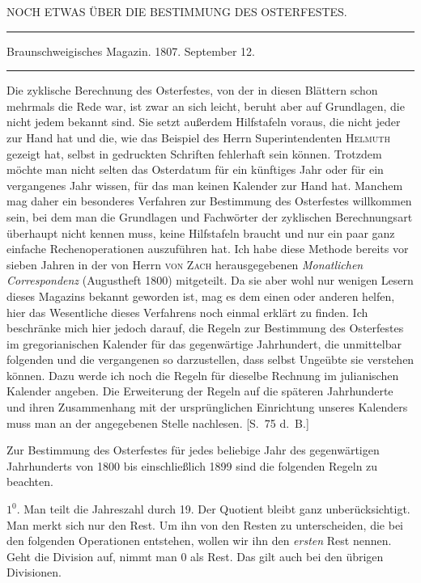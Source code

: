 \clearpage{}%
\begin{center}
{\large NOCH ETWAS ÜBER DIE BESTIMMUNG DES OSTERFESTES.\par}
\medskip\hrule\medskip
{\small Braunschweigisches Magazin. 1807. September 12.\par}
\medskip\hrule
\end{center}\medskip
Die zyklische Berechnung des Osterfestes, von der in diesen Blättern schon mehrmals die Rede war, ist zwar an sich leicht, beruht aber auf Grundlagen, die nicht jedem bekannt sind. Sie setzt außerdem Hilfstafeln voraus, die nicht jeder zur Hand hat und die, wie das Beispiel des Herrn Superintendenten \textsc{Helmuth} gezeigt hat, selbst in gedruckten Schriften fehlerhaft sein können. Trotzdem möchte man nicht selten das Osterdatum für ein künftiges Jahr oder für ein vergangenes Jahr wissen, für das man keinen Kalender zur Hand hat. Manchem mag daher ein besonderes Verfahren zur Bestimmung des Osterfestes willkommen sein, bei dem man die Grundlagen und Fachwörter der zyklischen Berechnungsart überhaupt nicht kennen muss, keine Hilfstafeln braucht und nur ein paar ganz einfache Rechenoperationen auszuführen hat. Ich habe diese Methode bereits vor sieben Jahren in der von Herrn \textsc{von Zach} herausgegebenen \textit{Monatlichen Correspondenz} (Augustheft 1800) mitgeteilt. Da sie aber wohl nur wenigen Lesern dieses Magazins bekannt geworden ist, mag es dem einen oder anderen helfen, hier das Wesentliche dieses Verfahrens noch einmal erklärt zu finden. Ich beschränke mich hier jedoch darauf, die Regeln zur Bestimmung des Osterfestes im gregorianischen Kalender für das gegenwärtige Jahrhundert, die unmittelbar %
%
folgenden und die vergangenen so darzustellen, dass selbst Ungeübte sie verstehen können. Dazu werde ich noch die Regeln für dieselbe Rechnung im julianischen Kalender angeben. Die Erweiterung der Regeln auf die späteren Jahrhunderte und ihren Zusammenhang mit der ursprünglichen Einrichtung unseres Kalenders muss man an der angegebenen Stelle nachlesen. [S.~75 d.~B.]

Zur Bestimmung des Osterfestes für jedes beliebige Jahr des gegenwärtigen Jahrhunderts von 1800 bis einschließlich 1899 sind die folgenden Regeln zu beachten.

$1^{0}$. Man teilt die Jahreszahl durch 19. Der Quotient bleibt ganz unberücksichtigt. Man merkt sich nur den Rest. Um ihn von den Resten zu unterscheiden, die bei den folgenden Operationen entstehen, wollen wir ihn den \textit{ersten} Rest nennen. Geht die Division auf, nimmt man 0 als Rest. Das gilt auch bei den übrigen Divisionen.

